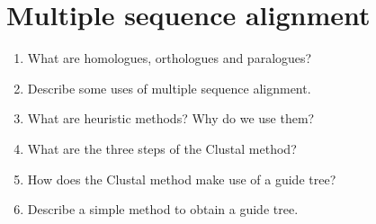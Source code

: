\documentclass[11pt]{article}
\begin{document}
\section{Multiple sequence alignment}
\begin{enumerate}
\item What are homologues, orthologues and paralogues?
\item Describe some uses of multiple sequence alignment.
\item What are heuristic methods? Why do we use them?
\item What are the three steps of the Clustal method?
\item How does the Clustal method make use of a guide tree?
\item Describe a simple method to obtain a guide tree.
\end{enumerate}
\end{document}
